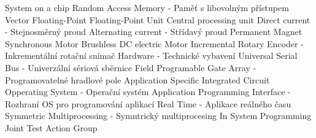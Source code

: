  {System on a chip}
 {Random Access Memory - Paměť s libovolným přístupem}
 {Vector Floating-Point}
 {Floating-Point Unit}
 {Central processing unit}
 {Direct current - Stejnosměrný proud}
 {Alternating current - Střídavý proud}
 {Permanent Magnet Synchronous Motor}
 {Brushless DC electric Motor}
 {Incremental Rotary Encoder - Inkrementální rotační snímač}
 {Hardware - Technické vybavení}
 {Universal Serial Bus - Univerzální sériová sběrnice}
 {Field Programable Gate Array - Programovatelné hradlové pole}
 {Application Specific Integrated Circuit}
 {Opperating System - Operační systém}
 {Application Programming Interface - Rozhraní OS pro programování aplikací}
 {Real Time - Aplikace reálného času}
 {Symmetric Multiprocessing - Symntrický multiprocesing}
 {In System Programming}
 {Joint Test Action Group}